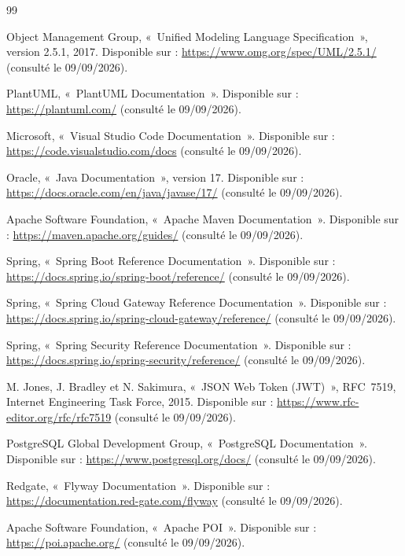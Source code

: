 \adjustmtc
\renewcommand\bibname{Bibliographie}

\begin{thebibliography}{99}
\thispagestyle{MyStyle}

Object Management Group, «~Unified Modeling Language Specification~», version 2.5.1, 2017. Disponible sur : \url{https://www.omg.org/spec/UML/2.5.1/} (consulté le 09/09/2026).

PlantUML, «~PlantUML Documentation~». Disponible sur : \url{https://plantuml.com/} (consulté le 09/09/2026).

Microsoft, «~Visual Studio Code Documentation~». Disponible sur : \url{https://code.visualstudio.com/docs} (consulté le 09/09/2026).

Oracle, «~Java Documentation~», version 17. Disponible sur : \url{https://docs.oracle.com/en/java/javase/17/} (consulté le 09/09/2026).

Apache Software Foundation, «~Apache Maven Documentation~». Disponible sur : \url{https://maven.apache.org/guides/} (consulté le 09/09/2026).

Spring, «~Spring Boot Reference Documentation~». Disponible sur : \url{https://docs.spring.io/spring-boot/reference/} (consulté le 09/09/2026).

Spring, «~Spring Cloud Gateway Reference Documentation~». Disponible sur : \url{https://docs.spring.io/spring-cloud-gateway/reference/} (consulté le 09/09/2026).

Spring, «~Spring Security Reference Documentation~». Disponible sur : \url{https://docs.spring.io/spring-security/reference/} (consulté le 09/09/2026).

M. Jones, J. Bradley et N. Sakimura, «~JSON Web Token (JWT)~», RFC~7519, Internet Engineering Task Force, 2015. Disponible sur : \url{https://www.rfc-editor.org/rfc/rfc7519} (consulté le 09/09/2026).

PostgreSQL Global Development Group, «~PostgreSQL Documentation~». Disponible sur : \url{https://www.postgresql.org/docs/} (consulté le 09/09/2026).

Redgate, «~Flyway Documentation~». Disponible sur : \url{https://documentation.red-gate.com/flyway} (consulté le 09/09/2026).

Apache Software Foundation, «~Apache POI~». Disponible sur : \url{https://poi.apache.org/} (consulté le 09/09/2026).


\end{thebibliography}
